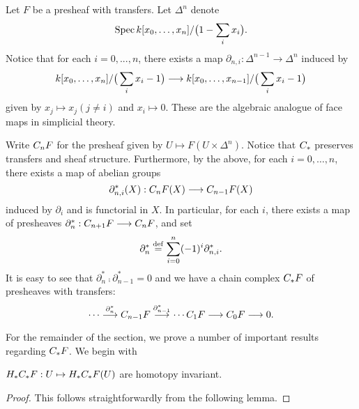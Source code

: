 \begin{constr}\label{constr_suslin_C}
Let $F$ be a presheaf with transfers. Let $\Delta^n$ denote
\[
\Spec \basefield [x_0,\dots,x_n]/\big(1 - \sum_{i} x_i \big).
\]
Notice that for each $i = 0,..., n$, there exists a map 
$\partial_{n, i} : \Delta^{n - 1} \to \Delta^{n}$ induced by
\[
\basefield [x_0,\dots,x_n]/\big(\sum_{i} x_i - 1 \big)
\to \basefield [x_0,\dots,x_{n - 1}]/\big(\sum_{i} x_i - 1 \big)
\]
given by $x_j \mapsto x_j (j \neq i)$ and $x_i \mapsto 0$. These
are the algebraic analogue of face maps in simplicial theory.

Write $\suslC[n] F$ for the presheaf given by $U \mapsto
F(U \times \Delta^n)$. Notice that $\suslC$ preserves transfers 
and sheaf structure. Furthermore, by the above, for each $i = 0,
\dots, n$, there exists a map of abelian groups
\[
\partial_{n,i}^*(X) : \suslC[n] F(X) \to \suslC[n - 1] F(X)
\]
induced by $\partial_i$ and is functorial in $X$. In particular, 
for each $i$, there exists a map of presheaves $\partial^*_n : 
\suslC[n + 1] F \to \suslC[n] F$, and set 
\[
\partial_{n}^* \defeq \sum_{i = 0}^{n} (-1)^i \partial_{n,i}^*.
\]
It is easy to see that $\partial_n^* \comp \partial_{n - 1}^* = 0$ 
and we have a chain complex $\suslC F$ of presheaves with 
transfers:
\[
\cdots \stackrel{\partial_n^*}{\to} \suslC[n - 1] F 
\stackrel{\partial_{n - 1}^*}{\to} \cdots \suslC[1] F \to
\suslC[0] F \to 0.
\]
\end{constr}

For the remainder of the section, we prove a number of important
results regarding $\suslC F$. We begin with

\begin{prop}\label{prop_susl_hom_is_hi}
$H_*\suslC F : U \mapsto H_*\suslC F(U)$ are homotopy invariant.
\end{prop}

\begin{proof}
This follows straightforwardly from the following lemma.
\end{proof}

